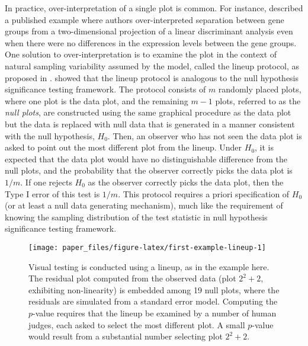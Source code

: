 \documentclass[]{interact}
\theoremstyle{plain}%
\theoremstyle{definition}
\theoremstyle{remark}
\begin{document}
In practice, over-interpretation of a single plot is common. For
instance, \citet{roy2015using} described a published example where
authors over-interpreted separation between gene groups from a
two-dimensional projection of a linear discriminant analysis even when
there were no differences in the expression levels between the gene
groups. One solution to over-interpretation is to examine the plot in
the context of natural sampling variability assumed by the model, called
the lineup protocol, as proposed in \citet{buja2009statistical}.
\citet{majumder2013validation} showed that the lineup protocol is
analogous to the null hypothesis significance testing framework. The
protocol consists of \(m\) randomly placed plots, where one plot is the
data plot, and the remaining \(m - 1\) plots, referred to as the
\emph{null plots}, are constructed using the same graphical procedure as
the data plot but the data is replaced with null data that is generated
in a manner consistent with the null hypothesis, \(H_0\). Then, an
observer who has not seen the data plot is asked to point out the most
different plot from the lineup. Under \(H_0\), it is expected that the
data plot would have no distinguishable difference from the null plots,
and the probability that the observer correctly picks the data plot is
\(1/m\). If one rejects \(H_0\) as the observer correctly picks the data
plot, then the Type I error of this test is \(1/m\). This protocol
requires a priori specification of \(H_0\) (or at least a null data
generating mechanism), much like the requirement of knowing the sampling
distribution of the test statistic in null hypothesis significance
testing framework.

\begin{figure}[t!]

{\centering \texttt{[image: paper\_files/figure-latex/first-example-lineup-1]} 

}

\caption{Visual testing is conducted using a lineup, as in the example here. The residual plot computed from the observed data (plot $2^2 + 2$, exhibiting non-linearity) is embedded among 19 null plots, where the residuals are simulated from a standard error model. Computing the $p$-value requires that the lineup be examined by a number of human judges, each asked to select the most different plot. A small $p$-value would result from a substantial number selecting plot $2^2 + 2$.}\label{fig:first-example-lineup}
\end{figure}
\end{document}
